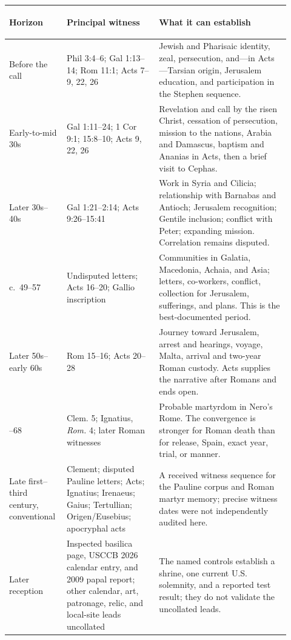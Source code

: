 \begin{longtable}{>{\bfseries\raggedright\arraybackslash}p{0.17\linewidth}
                  >{\raggedright\arraybackslash}p{0.31\linewidth}
                  >{\raggedright\arraybackslash}p{0.44\linewidth}}
\toprule
\textbf{Horizon} & \textbf{Principal witness} & \textbf{What it can establish}\\
\midrule
\endhead
Before the call & Phil 3:4--6; Gal 1:13--14; Rom 11:1; Acts 7--9, 22, 26 & Jewish and Pharisaic identity, zeal, persecution, and---in Acts---Tarsian origin, Jerusalem education, and participation in the Stephen sequence.\\
Early-to-mid 30s & Gal 1:11--24; 1 Cor 9:1; 15:8--10; Acts 9, 22, 26 & Revelation and call by the risen Christ, cessation of persecution, mission to the nations, Arabia and Damascus, baptism and Ananias in Acts, then a brief visit to Cephas.\\
Later 30s--40s & Gal 1:21--2:14; Acts 9:26--15:41 & Work in Syria and Cilicia; relationship with Barnabas and Antioch; Jerusalem recognition; Gentile inclusion; conflict with Peter; expanding mission. Correlation remains disputed.\\
c.~49--57 & Undisputed letters; Acts 16--20; Gallio inscription & Communities in Galatia, Macedonia, Achaia, and Asia; letters, co-workers, conflict, collection for Jerusalem, sufferings, and plans. This is the best-documented period.\\
Later 50s--early 60s & Rom 15--16; Acts 20--28 & Journey toward Jerusalem, arrest and hearings, voyage, Malta, arrival and two-year Roman custody. Acts supplies the narrative after Romans and ends open.\\
64--68 & 1 Clem. 5; Ignatius, \emph{Rom.} 4; later Roman witnesses & Probable martyrdom in Nero's Rome. The convergence is stronger for Roman death than for release, Spain, exact year, trial, or manner.\\
Late first--third century, conventional & 1 Clement; disputed Pauline letters; Acts; Ignatius; Irenaeus; Gaius; Tertullian; Origen/Eusebius; apocryphal acts & A received witness sequence for the Pauline corpus and Roman martyr memory; precise witness dates were not independently audited here.\\
Later reception & Inspected basilica page, USCCB 2026 calendar entry, and 2009 papal report; other calendar, art, patronage, relic, and local-site leads uncollated & The named controls establish a shrine, one current U.S. solemnity, and a reported test result; they do not validate the uncollated leads.\\
\bottomrule
\end{longtable}

